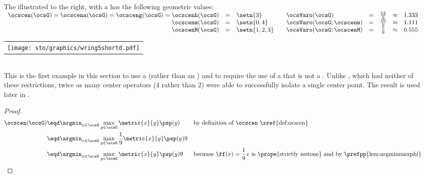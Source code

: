 \begin{tabstr}{0.75}
\begin{minipage}{\tw-65mm}%
\begin{example}%
\label{ex:wring5shortd}
The   illustrated to the right, with a  
has the following geometric values:
\\\indentx$\begin{array}{rcl@{\qquad} lcccl}
  \ocscen(\ocsG)=\ocscena(\ocsG)=\ocsceng(\ocsG)=\ocscenh(\ocsG) &=& \setn{3}    & \ocsVaro(\ocsG)          &=& \frac{12}{9} &\approx& 1.333\\
  \ocscenm(\ocsG)                                                &=& \setn{0,4}  & \ocsVaro(\ocsG;\ocscenm) &=& \frac{10}{9} &\approx& 1.111\\
  \ocscenM(\ocsG)                                                &=& \setn{1,2,3}& \ocsVaro(\ocsG;\ocscenM) &=& \frac{ 5}{9} &\approx& 0.555
\end{array}$
\end{example}
\end{minipage}\hfill%
\begin{tabular}{c}
  \gsize%
  {\texttt{[image: sto/graphics/wring5shortd.pdf]}}%
\end{tabular}
\\
This is the first example in this section to use a  
(rather than an  )
and to require the use of a   that is not a .
Unlike , which had neither of these restrictions,
twice as many center operators (4 rather than 2) were able to successfully isolate a single center point.
The  result is used later in .
\\
\begin{proof}
    \begin{align*}
      \ocscen(\ocsG)
        &\eqd \argmin_{x\in\ocsG}\max_{y\in\ocsG}\metric{x}{y}\psp(y)
        &&\text{by definition of $\ocscen$ \xref{def:ocscen}}
      \\&\eqd \argmin_{x\in\ocsG}\max_{y\in\ocsG}\frac{1}{9}\metric{x}{y}\psp(y)9
      \\&\eqd \argmin_{x\in\ocsG}\max_{y\in\ocsG}\metric{x}{y}\psp(y)9
        &&\text{because $\ff(x)=\frac{1}{9}x$ is \prope{strictly isotone} and by \prefpp{lem:argminmaxphi}}

\end{align*}
\end{proof}
\end{tabstr}
